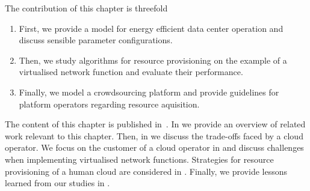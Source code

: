 The contribution of this chapter is threefold
\begin{enumerate}
\item First, we provide a model for energy efficient data center operation and discuss sensible parameter configurations. 
\item Then, we study algorithms for resource provisioning on the example of a virtualised network function and evaluate their performance.
\item Finally, we model a crowdsourcing platform and provide guidelines for platform operators regarding resource aquisition.
\end{enumerate}

The content of this chapter is published in~\cite{Schwartz2012a,Metzger2014a,Schwartz2015}.
In  we provide an overview of related work relevant to this chapter.
Then, in  we discuss the trade-offs faced by a cloud operator.
We focus on the customer of a cloud operator in  and discuss challenges when implementing virtualised network functions.
Strategies for resource provisioning of a human cloud are considered in .
Finally, we provide lessons learned from our studies in .





